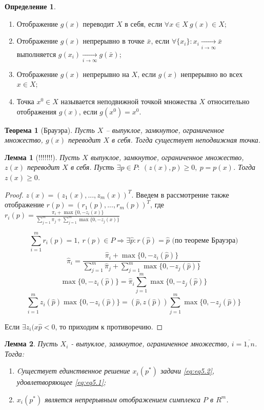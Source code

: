 \documentclass[12pt,a4paper,titlepage,oneside]{book}
\theoremstyle{definition}
\newtheorem{definition}{Определение}[chapter]
\theoremstyle{plain}
\newtheorem{theorem}{Теорема}[chapter]
\theoremstyle{remark}
\theoremstyle{remark}
\theoremstyle{plain}
\newtheorem{lemma}{Лемма}[chapter]
\theoremstyle{plain}
\begin{document}
\begin{definition}~
	
\begin{enumerate}
\item Отображение $g(x)$ переводит $X$ в себя, если $\forall x \in X~ g(x) \in X$;
\item Отображение $g(x)$ непрерывно в точке $\bar{x}$, если $\forall \{x_i\}: x_i \underset{i \to \infty}{\longrightarrow} \bar{x}$ выполняется $g(x_i) \underset{i \to \infty}{\longrightarrow} g(\bar{x})$;
\item Отображение $g(x)$ непрерывно на $X$, если $g(x)$ непрерывно во всех $x \in X$;
\item Точка $x^0 \in X$ называется неподвижной точкой множества $X$ относительно отображения $g(x)$, если $g(x^0) = x^0$.
\end{enumerate}
\end{definition}

\begin{theorem}[Брауэра]
Пусть $X$ -- выпуклое, замкнутое, ограниченное множество, $g(x)$ переводит $X$ в себя. Тогда существует неподвижная точка.
\end{theorem}

\begin{lemma}[!!!!!!!]
Пусть $X$ выпуклое, замкнутое, ограниченное множество, $z(x)$ переводит $X$ в себя. Пусть $\exists p \in P:~ (z(x),p) \geqslant 0,~p=p(x)$. Тогда $z(x) \geqslant 0$.
\end{lemma}
\begin{proof}
$z(x)=(z_1(x),...,z_m(x))^T$. Введем в рассмотрение также отображение $r(p)=(r_1(p),...,r_m(p))^T$, где $\displaystyle r_i(p)=\frac{\pi_i + \max\{0,-z_i(x)\}}{\sum_{j=1}^m \pi_j + \sum_{j=1}^m \max \{0, -z_j(x)\}}$
	
$$\sum_{i=1}^m r_i(p)=1,~r(p) \in P \Longrightarrow \exists \hat{p}:r(\hat{p})=\hat{p} \text{ (по теореме Брауэра)}$$
$$\hat{\pi}_i = \frac{\hat{\pi}_i + \max\{0,-z_i(\hat{p})\}}{\sum_{j=1}^m \hat{\pi}_j + \sum_{j=1}^m \max \{0, -z_j(\hat{p})\}}$$
$$\max\{0,-z_i(\hat{p})\} = \hat{\pi}_i \sum_{j=1}^m \max \{0, -z_j(\hat{p})\}$$
$$\sum_{i=1}^m z_i(\hat{p}) \max\{0,-z_i(\hat{p})\} = (\hat{p},z(\hat{p})) \sum_{j=1}^m \max \{0, -z_j(\hat{p})\}$$

Если $\exists z_i(x\hat{p}<0$, то приходим к противоречию.
\end{proof}


\begin{lemma}
Пусть $X_i$ - выпуклое, замкнутое, ограниченное множество, $i=\overline{1,n}$.
Тогда: 
\begin{enumerate}
\item Cуществует единственное решение $x_i(p^*)$  задачи \eqref{eq:eq5.2}, удовлетворяющее \eqref{eq:eq5.1};
\item $x_i(p^*)$ является непрерывным отображением симплекса $P$ в $\textit{R}^m$.
\end{enumerate}

\end{lemma}
\end{document}
